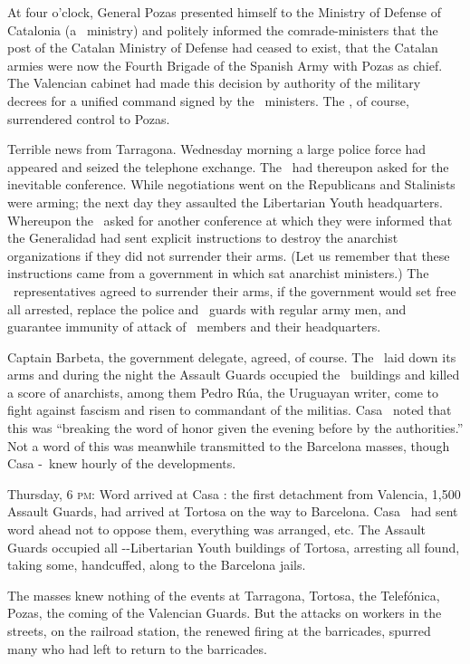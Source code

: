 At four o’clock, General Pozas presented himself to the Ministry of Defense of Catalonia (a \CNT\ ministry) and politely informed the comrade-ministers that the post of the Catalan Ministry of Defense had ceased to exist, that the Catalan armies were now the Fourth Brigade of the Spanish Army with Pozas as chief. The Valencian cabinet had made this decision by authority of the military decrees for a unified command signed by the \CNT\ ministers. The \CNT\kn, of course, surrendered control to Pozas.

Terrible news from Tarragona. Wednesday morning a large police force had appeared and seized the telephone exchange. The \CNT\ had thereupon asked for the inevitable conference. While negotiations went on the Republicans and Stalinists were arming; the next day they assaulted the Libertarian Youth headquarters. Whereupon the \CNT\ asked for another conference at which they were informed that the Generalidad had sent explicit instructions to destroy the anarchist organizations if they did not surrender their arms. (Let us remember that these instructions came from a government in which sat anarchist ministers.) The \CNT\ representatives agreed to surrender their arms, if the government would set free all arrested, replace the police and \PSUC\ guards with regular army men, and guarantee immunity of attack of \CNT\ members and their headquarters.

Captain Barbeta, the government delegate, agreed, of course. The \CNT\ laid down its arms and during the night the Assault Guards occupied the \CNT\ buildings and killed a score of anarchists, among them Pedro R\'ua, the Uruguayan writer, come to fight against fascism and risen to commandant of the militias. Casa \CNT\ noted that this was ``breaking the word of honor given the evening before by the authorities.'' Not a word of this was meanwhile transmitted to the Barcelona masses, though Casa \CNT-\FAI\ knew hourly of the developments.

Thursday, 6 \textsc{pm:} Word arrived at Casa \CNT: the first detachment from Valencia, 1,500 Assault Guards, had arrived at Tortosa on the way to Barcelona. Casa \CNT\ had sent word ahead not to oppose them, everything was arranged, etc. The Assault Guards occupied all \CNT-\FAI-Libertarian Youth buildings of Tortosa, arresting all found, taking some, handcuffed, along to the Barcelona jails.

The masses knew nothing of the events at Tarragona, Tortosa, the Telef\'onica, Pozas, the coming of the Valencian Guards. But the attacks on workers in the streets, on the railroad station, the renewed firing at the barricades, spurred many who had left to return to the barricades.

